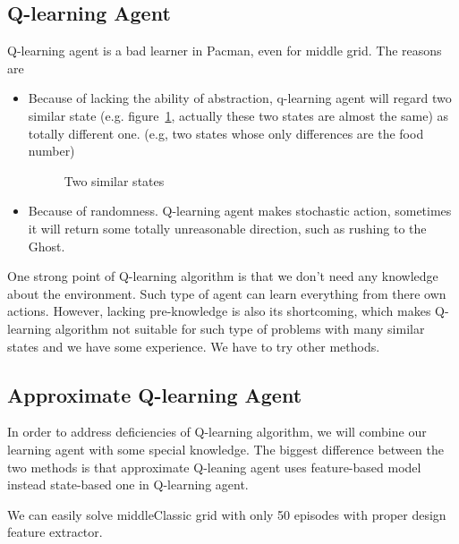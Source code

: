 \documentclass[12pt,a4paper]{article}
\begin{document}
	\subsection{Q-learning Agent}
	Q-learning agent is a bad learner in Pacman, even for middle grid. The reasons are 
	\begin{itemize}
		\vspace{-2ex}\item Because of lacking the ability of abstraction, q-learning agent will regard two similar state (e.g. figure~\ref{fig:smilar}, actually these two states are almost the same) as totally different one. (e.g, two states whose only differences are the food number)
		\begin{figure}[ht]
			\centering
			\caption{Two similar states}
			\label{fig:smilar}
		\end{figure} 
		\vspace{-2ex}\item Because of randomness. Q-learning agent makes stochastic action, sometimes it will return some totally unreasonable direction, such as rushing to the Ghost.
	\end{itemize}
	\vspace{-2ex}One strong point of Q-learning algorithm is that we don't need any knowledge about the environment. Such type of agent can learn everything from there own actions. However, lacking pre-knowledge is also its shortcoming, which makes Q-learning algorithm not suitable for such type of problems with many similar states and we have some experience. We have to try other methods. 
	\subsection{Approximate Q-learning Agent}
	In order to address deficiencies of Q-learning algorithm, we will combine our learning agent with some special knowledge. The biggest difference between the two methods is that approximate Q-leaning agent uses feature-based model instead state-based one in Q-learning agent.\par
	We can easily solve middleClassic grid with only 50 episodes with proper design feature extractor.
\end{document}
